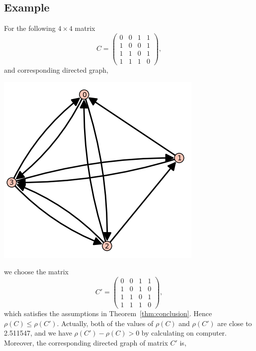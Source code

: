 \documentclass[12pt, a4paper]{article}
\theoremstyle{plain}
\theoremstyle{definition}
\begin{document}
\subsection{Example}
    For the following $4\times 4$ matrix
    $$C=\begin{pmatrix}
    0 & 0 & 1 & 1\\
    1 & 0 & 0 & 1\\
    1 & 1 & 0 & 1\\
    1 & 1 & 1 & 0
    \end{pmatrix},$$
    and corresponding directed graph, \cite[sage]{sage}
    \begin{center}
    \includegraphics{graph_C.PNG}
    \end{center}
    we choose the matrix
    $$C'=\begin{pmatrix}
    0 & 0 & 1 & 1\\
    1 & 0 & 1 & 0\\
    1 & 1 & 0 & 1\\
    1 & 1 & 1 & 0
    \end{pmatrix},$$
    which satisfies the assumptions in Theorem~\ref{thm:conclusion}. Hence $\rho(C)\leq\rho(C')$.
     Actually, both of the values of $\rho(C)$ and $\rho(C')$ are close to 2.511547, and we have
      $\rho(C')-\rho(C)>0$ by calculating on computer.
    Moreover, the corresponding directed graph of matrix $C'$ is, \cite[sage]{sage}
\end{document}
